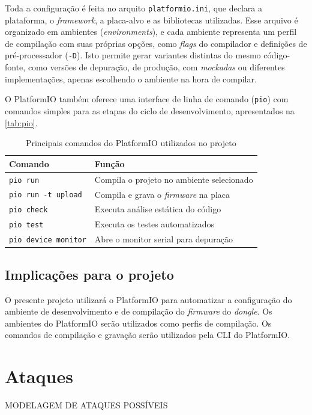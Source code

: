 Toda a configuração é feita no arquito \texttt{platformio.ini}, que declara a plataforma, o \textit{framework}, a placa-alvo e as bibliotecas utilizadas. Esse arquivo é organizado em ambientes (\textit{environments}), e cada ambiente representa um perfil de compilação com suas próprias opções, como \textit{flags} do compilador e definições de pré-processador (\texttt{-D}). Isto permite gerar variantes distintas do mesmo código-fonte, como versões de depuração, de produção, com \textit{mockadas} ou diferentes implementações, apenas escolhendo o ambiente na hora de compilar. 


O PlatformIO também oferece uma interface de linha de comando (\texttt{pio}) com comandos simples para as etapas do ciclo de desenvolvimento, apresentados na \autoref{tab:pio}.

\begin{table}[htb]
\centering
\caption{Principais comandos do PlatformIO utilizados no projeto}
\label{tab:pio}
\begin{tabular}{ll}
\hline
Comando & Função \\ \hline
\texttt{pio run} & Compila o projeto no ambiente selecionado \\
\texttt{pio run -t upload} & Compila e grava o \textit{firmware} na placa \\
\texttt{pio check} & Executa análise estática do código \\
\texttt{pio test} & Executa os testes automatizados \\
\texttt{pio device monitor} & Abre o monitor serial para depuração \\ \hline
\end{tabular}
\end{table}

\subsection{Implicações para o projeto}

O presente projeto utilizará o PlatformIO para automatizar a configuração do ambiente de desenvolvimento e de compilação do \textit{firmware} do \textit{dongle}. Os ambientes do PlatformIO serão utilizados como perfis de compilação. Os comandos de compilação e gravação serão utilizados pela CLI do PlatformIO.

\section{Ataques}

MODELAGEM DE ATAQUES POSSÍVEIS
